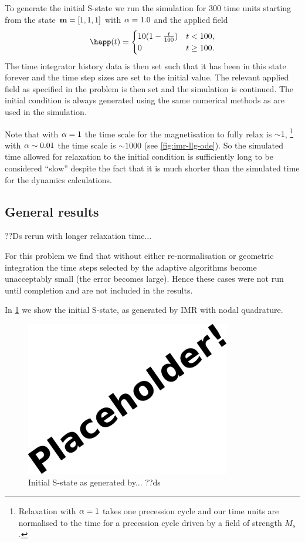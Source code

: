 To generate the initial S-state we run the simulation for 300 time units starting from the state $\boldsymbol{\mathrm{m}}=[1,1,1]$ with $\alpha = 1.0$ and the applied field
\begin{equation}
  \happ(t) =
  \begin{cases}
    10 (1- \frac{t}{100}) & t < 100, \\
    0 & t \geq 100.
  \end{cases}
\end{equation}
The time integrator history data is then set such that it has been in this state forever and the time step sizes are set to the initial value.
The relevant applied field as specified in the problem is then set and the simulation is continued.
The initial condition is always generated using the same numerical methods as are used in the simulation.

Note that with $\alpha = 1$ the time scale for the magnetisation to fully relax is $\sim 1$, \footnote{Relaxation with $\alpha = 1$ takes one precession cycle and our time units are normalised to the time for a precession cycle driven by a field of strength $M_s$.} with $\alpha \sim 0.01$ the time scale is $\sim 1000$ (see \eg \cref{fig:imr-llg-ode}).
So the simulated time allowed for relaxation to the initial condition is sufficiently long to be considered ``slow'' despite the fact that it is much shorter than the simulated time for the dynamics calculations.



\subsection{General results}

??Ds rerun with longer relaxation time...

For this problem we find that without either re-normalisation or geometric integration the time steps selected by the adaptive algorithms become unacceptably small (\ie the error becomes large).
Hence these cases were not run until completion and are not included in the results.

In \cref{fig:intial-mumag4} we show the initial S-state, as generated by IMR with nodal quadrature.
\begin{figure}
  \centering
  \includegraphics[width=0.8\textwidth]{images/placeholder}
  \caption{Initial S-state as generated by... ??ds}
  \label{fig:intial-mumag4}
\end{figure}

